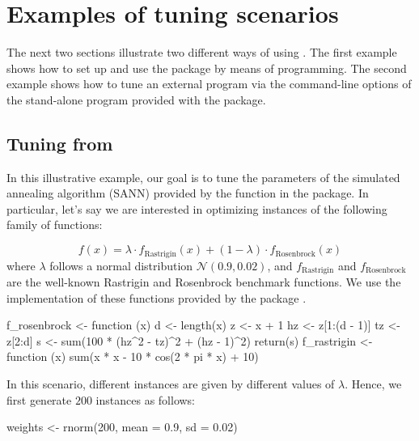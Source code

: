 \documentclass[article,a4paper,nojss,notitle]{jss}
\newcommand{\irace}{\pkg{irace}\xspace}
\newcommand{\aR}{\proglang{R}\xspace}
\newcommand{\parameter}[1]{\code{#1}}
\begin{document}

\section{Examples of tuning scenarios}\label{sec:applications}

The next two sections illustrate two different ways of using
\irace. The first example shows how to set up and use the \irace
package by means of \aR programming. The second example shows how to
tune an external program via the command-line options of the \irace
stand-alone program provided with the package.

\subsection[Tuning optim() from R]{Tuning  from \aR}

In this illustrative example, our goal is to tune the parameters of
the simulated annealing algorithm (SANN) provided by the 
function in the \aR {} package. In particular, let's say we
are interested in optimizing instances of the following family of
functions:

\begin{equation}
  \label{eq:1}
  f(x) = \lambda \cdot f_\text{Rastrigin} (x) + (1 - \lambda) \cdot f_\text{Rosenbrock}(x)
\end{equation}
%
where $\lambda$ follows a normal distribution $\mathcal{N}(0.9,
0.02)$, and $f_\text{Rastrigin}$ and $f_\text{Rosenbrock}$ are the
well-known Rastrigin and Rosenbrock benchmark functions. We use the implementation of these functions provided by the package  \citep{R:cmaes}. 

\begin{CodeInput}
f_rosenbrock <- function (x) {
  d <- length(x)
  z <- x + 1
  hz <- z[1:(d - 1)]
  tz <- z[2:d]
  s <- sum(100 * (hz^2 - tz)^2 + (hz - 1)^2)
  return(s)
}
f_rastrigin <- function (x) {
  sum(x * x - 10 * cos(2 * pi * x) + 10)
}
\end{CodeInput}

In this scenario, different instances are given by different values of
$\lambda$. Hence, we first generate $200$ instances as follows:

\begin{CodeInput}
weights <- rnorm(200, mean = 0.9, sd = 0.02)
\end{CodeInput}
\end{document}
